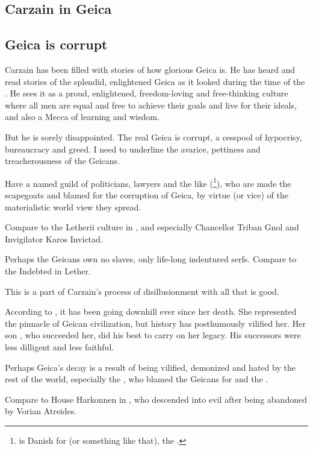 \begin{garbage}
\section{Carzain in Geica}
\subsection{Geica is corrupt}
Carzain has been filled with stories of how glorious Geica is. He has heard and read stories of the splendid, enlightened Geica as it looked during the time of the . He sees it as a proud, enlightened, freedom-loving and free-thinking culture where all men are equal and free to achieve their goals and live for their ideals, and also a Mecca of learning and wisdom. 

But he is sorely disappointed. The real Geica is corrupt, a cesspool of hypocrisy, bureaucracy and greed. I need to underline the avarice, pettiness and treacherousness of the Geicans. 

Have a named guild of politicians, lawyers and the like (\footnote{\quo{\DJOF} is Danish for  (or something like that), the .}), who are made the scapegoats and blamed for the corruption of Geica, by virtue (or vice) of the materialistic world view they spread. 

Compare to the Letherii culture in \cite{StevenEriksonIanCameronEsslemont:MalazanBookoftheFallen}, and especially Chancellor Triban Gnol and Invigilator Karos Invictad. 

Perhaps the Geicans own no slaves, only life-long indentured serfs. Compare to the Indebted in Lether. 

This is a part of Carzain's process of disillusionment with all that is good. 

According to \Belzir, it has been going downhill ever since her death. She represented the pinnacle of Geican civilization, but history has posthumously vilified her. Her son , who succeeded her, did his best to carry on her legacy. His successors were less dilligent and less faithful. 

Perhaps Geica's decay is a result of being vilified, demonized and hated by the rest of the world, especially the , who blamed the Geicans for \Belzir{} and the \hs{\Darkfall}. 

Compare to House Harkonnen in , who descended into evil after being abandoned by Vorian Atreides. 


\end{garbage}
